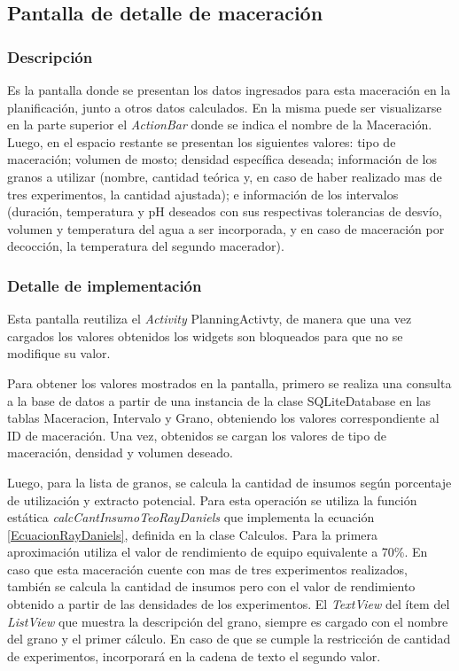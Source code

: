         \subsection{Pantalla de detalle de maceración}
        \label{DescripPantallaDetalleMaceración}
            \subsubsection{Descripción}
            Es la pantalla donde se presentan los datos ingresados para esta maceración en la planificación, junto a otros datos calculados.
            En la misma puede ser visualizarse en la parte superior el \textit{ActionBar} donde se indica el nombre de la Maceración. Luego, en el espacio restante se presentan los siguientes valores: tipo de maceración; volumen de mosto; densidad específica deseada; información de los granos a utilizar (nombre, cantidad teórica y, en caso de haber realizado mas de tres experimentos, la cantidad ajustada); e información de los intervalos (duración, temperatura y pH deseados con sus respectivas tolerancias de desvío, volumen y temperatura del agua a ser incorporada, y en caso de maceración por decocción, la temperatura del segundo macerador).
            
            \subsubsection{Detalle de implementación}
            \par Esta pantalla reutiliza el \textit{Activity} PlanningActivty, de manera que una vez cargados los valores obtenidos los widgets son bloqueados para que no se modifique su valor. 
            \par Para obtener los valores mostrados en la pantalla, primero se realiza una consulta a la base de datos a partir de una instancia de la clase SQLiteDatabase en las tablas Maceracion, Intervalo y Grano, obteniendo los valores correspondiente al ID de maceración. Una vez, obtenidos se cargan los valores de tipo de maceración, densidad y volumen deseado. 
            
            \par Luego, para la lista de granos, se calcula la cantidad de insumos según porcentaje de utilización y extracto potencial. Para esta operación se utiliza la función estática \textit{calcCantInsumoTeoRayDaniels} que implementa la ecuación \ref{EcuacionRayDaniels}, definida en la clase Calculos. Para la primera aproximación utiliza el valor de rendimiento de equipo equivalente a 70\%. En caso que esta maceración cuente con mas de tres experimentos realizados, también se calcula la cantidad de insumos pero con el valor de rendimiento obtenido a partir de las densidades de los experimentos. El \textit{TextView} del ítem del \textit{ListView} que muestra la descripción del grano, siempre es cargado con el nombre del grano y el primer cálculo. En caso de que se cumple la restricción de cantidad de experimentos, incorporará en la cadena de texto el segundo valor.
            
